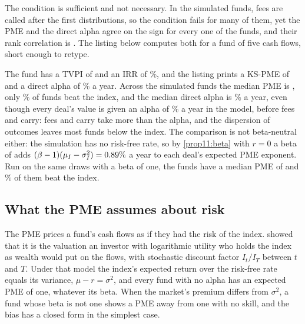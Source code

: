 \begin{chapterrefs}
The condition is sufficient and not necessary. In the simulated funds, fees are called after the
first distributions, so the condition fails for many of them, yet the PME and the direct alpha agree
on the sign for every one of the \jcFunds{} funds, and their rank correlation is \pkCorr. The listing
below computes both for a fund of five cash flows, short enough to retype.

The fund has a TVPI of \pkSnipTvpi{} and an IRR of \pkSnipIrr\%, and the listing prints a KS-PME of
\pkSnipPme{} and a direct alpha of \pkSnipAlpha\% a year. Across the simulated funds the median PME is
\pkMed, only \pkAbove\% of funds beat the index, and the median direct alpha is \pkDaMed\% a year, even
though every deal's value is given an alpha of \jcAlpha\% a year in the model, before fees and carry: fees and carry take more than the alpha, and the
dispersion of outcomes leaves most funds below the index. The comparison is not beta-neutral either: the
simulation has no risk-free rate, so by \cref{prop11:beta} with $r=0$ a beta of \jcBeta{} adds
$(\beta-1)(\mu_I-\sigma_I^2)=0.89\%$ a year to each deal's expected PME exponent. Run on the same
draws with a beta of one, the funds have a median PME of \pkMedBetaOne{} and \pkAboveBetaOne\% of them beat the index.

\subsection{What the PME assumes about risk}

The PME prices a fund's cash flows as if they had the risk of the index. \textcite{sorensen2015} showed
that it is the valuation an investor with logarithmic utility who holds the index as wealth would put
on the flows, with stochastic discount factor $I_t/I_T$ between $t$ and $T$. Under that model the index's
expected return over the risk-free rate equals its variance, $\mu-r=\sigma^2$, and every fund with no
alpha has an expected PME of one, whatever its beta. When the market's premium differs from $\sigma^2$, a
fund whose beta is not one shows a PME away from one with no skill, and the bias has a closed form in
the simplest case.


\end{chapterrefs}
